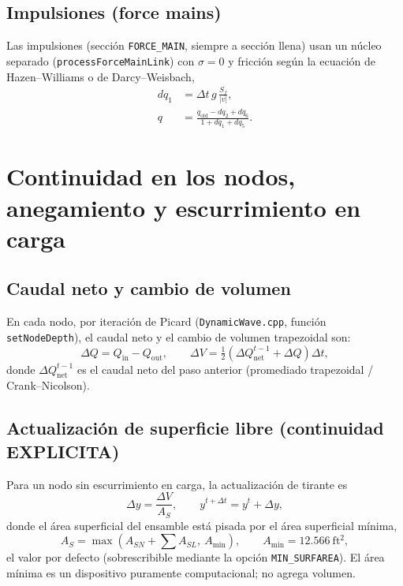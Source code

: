 \documentclass[11pt,a4paper]{article}
\newcommand{\sfft}{\mathrm{ft^2}}
\begin{document}
\subsection{Impulsiones (force mains)}

Las impulsiones (sección \texttt{FORCE\_MAIN}, siempre a sección llena) usan un
núcleo separado (\texttt{process\-Force\-Main\-Link}) con $\sigma = 0$ y
fricción según la ecuación de Hazen--Williams o de Darcy--Weisbach,
\begin{equation}
  \begin{aligned}
    dq_1 &= \Delta t\, g\, \frac{S_f}{\lvert v \rvert},\\
    q &= \frac{q_{\mathrm{old}} - dq_2 + dq_6}{1 + dq_1 + dq_5}.
  \end{aligned}
\end{equation}

\section{Continuidad en los nodos, anegamiento y escurrimiento en carga}
\label{sec:node-cont}

\subsection{Caudal neto y cambio de volumen}

En cada nodo, por iteración de Picard (\texttt{DynamicWave.cpp}, función
\texttt{setNodeDepth}), el caudal neto y el cambio de volumen trapezoidal son:
\begin{equation}
  \Delta Q = Q_{\mathrm{in}} - Q_{\mathrm{out}}, \qquad
  \Delta V = \tfrac{1}{2}\left(\Delta Q_{\mathrm{net}}^{t-1} + \Delta Q\right)
  \Delta t,
\end{equation}
donde $\Delta Q_{\mathrm{net}}^{t-1}$ es el caudal neto del paso anterior
(promediado trapezoidal / Crank--Nicolson).

\subsection{Actualización de superficie libre (continuidad EXPLICITA)}

Para un nodo sin escurrimiento en carga, la actualización de tirante es
\begin{equation}
  \Delta y = \frac{\Delta V}{A_S}, \qquad
  y^{t+\Delta t} = y^{t} + \Delta y,
\end{equation}
donde el área superficial del ensamble está pisada por el área superficial
mínima,
\begin{equation}
  A_S = \max\left(A_{SN} + \sum A_{SL},\ A_{\min}\right),
  \qquad A_{\min} = 12.566\ \sfft,
\end{equation}
el valor por defecto (sobrescribible mediante la opción
\texttt{MIN\_SURFAREA}). El área mínima es un dispositivo puramente
computacional; no agrega volumen.
\end{document}
